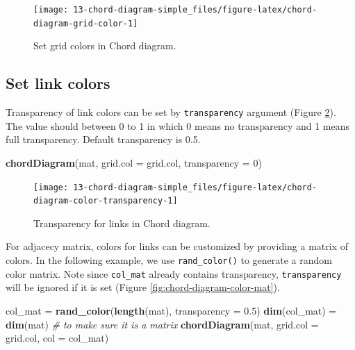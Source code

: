 \documentclass[]{book}
\newenvironment{Shaded}{\begin{snugshade}}{\end{snugshade}}
\newcommand{\KeywordTok}[1]{\textcolor[rgb]{0.13,0.29,0.53}{\textbf{#1}}}
\newcommand{\DataTypeTok}[1]{\textcolor[rgb]{0.13,0.29,0.53}{#1}}
\newcommand{\DecValTok}[1]{\textcolor[rgb]{0.00,0.00,0.81}{#1}}
\newcommand{\FloatTok}[1]{\textcolor[rgb]{0.00,0.00,0.81}{#1}}
\newcommand{\StringTok}[1]{\textcolor[rgb]{0.31,0.60,0.02}{#1}}
\newcommand{\CommentTok}[1]{\textcolor[rgb]{0.56,0.35,0.01}{\textit{#1}}}
\newcommand{\NormalTok}[1]{#1}
\theoremstyle{definition}
\theoremstyle{definition}
\theoremstyle{remark}
\begin{document}
\begin{figure}

{\centering \texttt{[image: 13-chord-diagram-simple\_files/figure-latex/chord-diagram-grid-color-1]} 

}

\caption{Set grid colors in Chord diagram.}\label{fig:chord-diagram-grid-color}
\end{figure}

\subsection{Set link colors}\label{chord-diagram-link-color}

Transparency of link colors can be set by \texttt{transparency} argument
(Figure \ref{fig:chord-diagram-color-transparency}). The value should
between 0 to 1 in which 0 means no transparency and 1 means full
transparency. Default transparency is 0.5.

\begin{Shaded}
\begin{Highlighting}[]
\KeywordTok{chordDiagram}\NormalTok{(mat, }\DataTypeTok{grid.col =}\NormalTok{ grid.col, }\DataTypeTok{transparency =} \DecValTok{0}\NormalTok{)}
\end{Highlighting}
\end{Shaded}

\begin{figure}

{\centering \texttt{[image: 13-chord-diagram-simple\_files/figure-latex/chord-diagram-color-transparency-1]} 

}

\caption{Transparency for links in Chord diagram.}\label{fig:chord-diagram-color-transparency}
\end{figure}

For adjacecy matrix, colors for links can be customized by providing a
matrix of colors. In the following example, we use
\texttt{rand\_color()} to generate a random color matrix. Note since
\texttt{col\_mat} already contains transparency, \texttt{transparency}
will be ignored if it is set (Figure \ref{fig:chord-diagram-color-mat}).

\begin{Shaded}
\begin{Highlighting}[]
\NormalTok{col_mat =}\StringTok{ }\KeywordTok{rand_color}\NormalTok{(}\KeywordTok{length}\NormalTok{(mat), }\DataTypeTok{transparency =} \FloatTok{0.5}\NormalTok{)}
\KeywordTok{dim}\NormalTok{(col_mat) =}\StringTok{ }\KeywordTok{dim}\NormalTok{(mat)  }\CommentTok{# to make sure it is a matrix}
\KeywordTok{chordDiagram}\NormalTok{(mat, }\DataTypeTok{grid.col =}\NormalTok{ grid.col, }\DataTypeTok{col =}\NormalTok{ col_mat)}
\end{Highlighting}
\end{Shaded}
\end{document}
